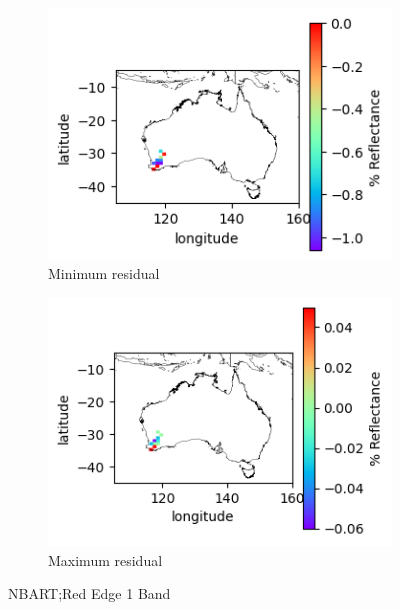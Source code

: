 \documentclass[a4paper]{article}
\begin{document}
      \begin{figure}[h!]
        \centering
          \begin{subfigure}[l]{.4\linewidth}
            \hspace{-32mm}
            \includegraphics[scale=0.9]{plots/nbart/nbart_red_edge_1-MinResidual.png}
            \caption{Minimum residual}
          \end{subfigure}
%
          \begin{subfigure}[r]{.4\linewidth}
            \includegraphics[scale=0.9]{plots/nbart/nbart_red_edge_1-MaxResidual.png}
            \caption{Maximum residual}
          \end{subfigure}
        \caption{NBART;\@ Red Edge 1 Band}\label{figure:9}
      \end{figure}
\end{document}

